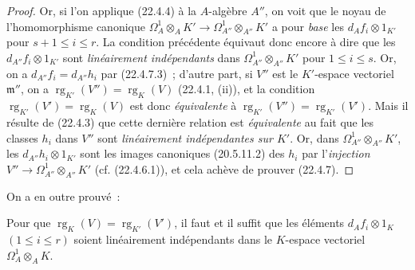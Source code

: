 \begin{proof}
Or, si l'on applique (22.4.4) à la $A$-algèbre $A''$, on voit que le noyau de
l'homomorphisme canonique
$\Omega^1_A\otimes_AK'\longrightarrow\Omega^1_{A''}\otimes_{A''}K'$ a pour
\emph{base} les $d_Af_i\otimes1_{K'}$ pour $s+1\leqslant i\leqslant r$. La condition
précédente équivaut donc encore à dire que les $d_{A''}f_i\otimes1_{K'}$ sont
\emph{linéairement indépendants} dans $\Omega^1_{A''}\otimes_{A''}K'$ pour
$1\leqslant i\leqslant s$. Or, on a $d_{A''}f_i=d_{A''}h_i$ par (22.4.7.3)~;
d'autre part, si $V''$ est le $K'$-espace vectoriel $\mathfrak m''$, on a
$\operatorname{rg}_{K'}(V'')=\operatorname{rg}_K(V)$ (22.4.1, (ii)), et la condition
$\operatorname{rg}_{K'}(V')=\operatorname{rg}_K(V)$ est donc \emph{équivalente} à
$\operatorname{rg}_{K'}(V'')=\operatorname{rg}_{K'}(V')$. Mais il résulte de (22.4.3) que cette dernière
relation est \emph{équivalente} au fait que les classes $h_i$
dans $V''$ sont \emph{linéairement indépendantes sur $K'$}. Or, dans
$\Omega^1_{A''}\otimes_{A''}K'$, les $d_{A''}h_i\otimes1_{K'}$ sont les images
canoniques (20.5.11.2) des $h_i$ par l'\emph{injection}
$V''\longrightarrow\Omega^1_{A''}\otimes_{A''}K'$ (cf. (22.4.6.1)), et cela
achève de prouver (22.4.7).
\end{proof}

On a en outre prouvé~:

\begin{corollary}[22.4.7.4]
\label{0.22.4.7.4-fr}
Pour que $\operatorname{rg}_K(V)=\operatorname{rg}_{K'}(V')$, il faut et il suffit que les éléments
$d_Af_i\otimes1_K$ $(1\leqslant i\leqslant r)$ soient linéairement
indépendants dans le $K$-espace vectoriel $\Omega^1_A\otimes_AK$.
\end{corollary}

